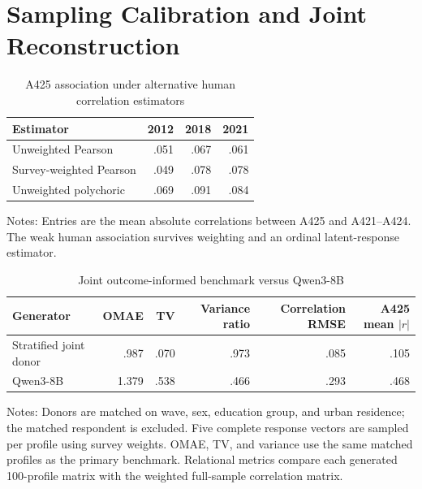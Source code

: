 \documentclass[11pt]{article}
\begin{document}
\section{Sampling Calibration and Joint Reconstruction}

\begin{table}[!htbp]
\centering
\caption{A425 association under alternative human correlation estimators}
\label{tab:s10-correlation-sensitivity}
\begin{threeparttable}
\small
\begin{tabular}{lrrr}
\toprule
Estimator & 2012 & 2018 & 2021 \\
\midrule
Unweighted Pearson & .051 & .067 & .061 \\
Survey-weighted Pearson & .049 & .078 & .078 \\
Unweighted polychoric & .069 & .091 & .084 \\
\bottomrule
\end{tabular}
\begin{tablenotes}[flushleft]
\footnotesize
\item Notes: Entries are the mean absolute correlations between A425 and A421--A424. The weak
human association survives weighting and an ordinal latent-response estimator.
\end{tablenotes}
\end{threeparttable}
\end{table}

\begin{table}[!htbp]
\centering
\caption{Joint outcome-informed benchmark versus Qwen3-8B}
\label{tab:s11-joint-donor}
\begin{threeparttable}
\small
\begin{tabular}{lrrrrr}
\toprule
Generator & OMAE & TV & Variance ratio & Correlation RMSE & A425 mean $|r|$ \\
\midrule
Stratified joint donor & .987 & .070 & .973 & .085 & .105 \\
Qwen3-8B & 1.379 & .538 & .466 & .293 & .468 \\
\bottomrule
\end{tabular}
\begin{tablenotes}[flushleft]
\footnotesize
\item Notes: Donors are matched on wave, sex, education group, and urban residence; the matched
respondent is excluded. Five complete response vectors are sampled per profile using survey weights.
OMAE, TV, and variance use the same matched profiles as the primary benchmark. Relational metrics
compare each generated 100-profile matrix with the weighted full-sample correlation matrix.
\end{tablenotes}
\end{threeparttable}
\end{table}
\end{document}
